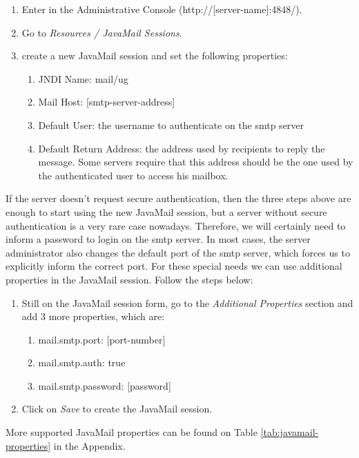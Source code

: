 \documentclass[envcountsame,envcountchap,letterpaper]{svmono}
\begin{document}
\begin{enumerate}
\item Enter in the Administrative Console (http://[server-name]:4848/).
\item Go to \textit{Resources / JavaMail Sessions}.
\item create a new JavaMail session and set the following properties:
   \begin{enumerate}
   \item JNDI Name: mail/ug
   \item Mail Host: [smtp-server-address]
   \item Default User: the username to authenticate on the smtp
    server
   \item Default Return Address: the address used by recipients to
    reply the message. Some servers require that this address
    should be the one used by the authenticated user to access his
    mailbox.
   \end{enumerate}
\end{enumerate}
 
If the server doesn't request secure authentication, then the three steps above are enough to start using the new JavaMail session, but a server without secure authentication is a very rare case nowadays. Therefore, we will certainly need to inform a password to login on the smtp server. In most cases, the server administrator also changes the default port of the smtp server, which forces us to explicitly inform the correct port. For these special needs we can use additional properties in the JavaMail session. Follow the steps below:

\begin{enumerate}
\item Still on the JavaMail session form, go to the \textit{Additional Properties} section and add 3 more properties, which are:
   \begin{enumerate}
   \item mail.smtp.port: [port-number]
   \item mail.smtp.auth: true
   \item mail.smtp.password: [password]
   \end{enumerate}
\item Click on \textit{Save} to create the JavaMail session.
\end{enumerate}

More supported JavaMail properties can be found on Table \ref{tab:javamail-properties} in the Appendix.
\end{document}
